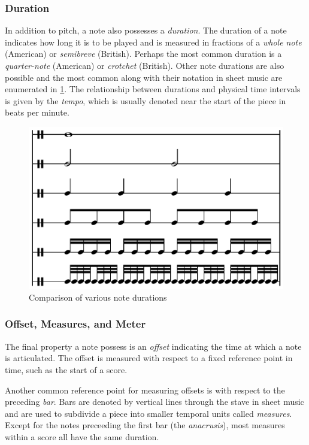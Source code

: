 \subsubsection{Duration}

In addition to pitch, a note also possesses a \emph{duration}. The duration of
a note indicates how long it is to be played and is measured in fractions of a
\emph{whole note} (American) or \emph{semibreve} (British). Perhaps the most
common duration is a \emph{quarter-note} (American) or \emph{crotchet}
(British). Other note durations are also possible and the most common along
with their notation in sheet music are enumerated in
\cref{fig:note-durations}. The relationship between durations and
physical time intervals is given by the \emph{tempo}, which is usually
denoted near the start of the piece in beats per minute.

\begin{figure}[tb]
    \centering
    \includegraphics[width=0.6\linewidth]{note-durations.png}
    \caption{Comparison of various note durations \citep{wiki-note-durations}}
    \label{fig:note-durations}
\end{figure}

\subsubsection{Offset, Measures, and Meter}

The final property a note possess is an \emph{offset} indicating the time at
which a note is articulated. The offset is measured with respect to a fixed
reference point in time, such as the start of a score.

Another common reference point for measuring offsets is with respect to the
preceding \emph{bar}. Bars are denoted by vertical lines through the
stave in sheet music and are used to subdivide a piece into smaller temporal
units called \emph{measures}. Except for the notes preceeding the first bar
(\ie the \emph{anacrusis}), most measures within a score all have the same
duration.

